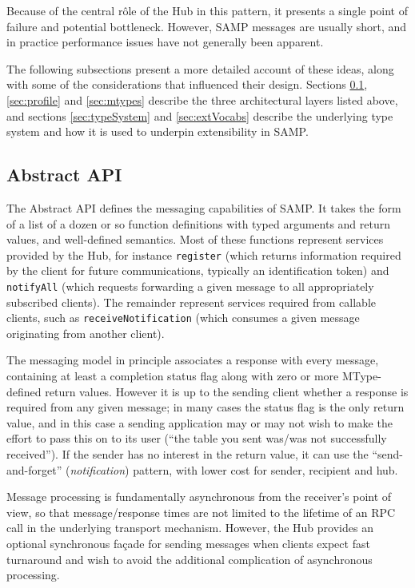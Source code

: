 \documentclass[5p]{elsarticle}
\begin{document}
Because of the central r\^{o}le of the Hub in this pattern,
it presents a single point of failure and potential bottleneck.
However, SAMP messages are usually short,
and in practice performance issues have not generally been apparent.

The following subsections present a more detailed account of
these ideas, along with some of the considerations that influenced
their design.
Sections \ref{sec:abstractApi}, \ref{sec:profile} and \ref{sec:mtypes}
describe the three architectural layers listed above,
and sections \ref{sec:typeSystem} and \ref{sec:extVocabs}
describe the underlying type system and how it is used to underpin
extensibility in SAMP.

\subsection{Abstract API} \label{sec:abstractApi}

The Abstract API defines the messaging capabilities of SAMP.
It takes the form of a list of a dozen or so function definitions
with typed arguments and return values, and well-defined semantics.
Most of these functions represent services provided by the Hub,
for instance
{\tt register} (which returns information required by the
client for future communications, typically an identification token)
and {\tt notifyAll} (which requests forwarding a given message to
all appropriately subscribed clients).
The remainder represent services required from callable clients, such as
{\tt receiveNotification} (which consumes a given message originating
from another client).

The messaging model in principle associates
a response with every message, containing at least a completion
status flag along with zero or more MType-defined return values.
However it is up to the sending client whether a response is
required from any given message; in many cases the status flag
is the only return value, and in this case a sending application
may or may not wish to make the effort to pass this on to its user
(``the table you sent was/was not successfully received'').
If the sender has no interest in the return value, it can use
the ``send-and-forget'' ({\em notification\/}) pattern,
with lower cost for sender, recipient and hub.

Message processing is fundamentally asynchronous from the
receiver's point of view, so that message/response times are
not limited to the lifetime of an RPC call in the underlying
transport mechanism.
However, the Hub provides an optional synchronous
fa\c{c}ade for sending messages when clients expect fast turnaround
and wish to avoid the additional complication of asynchronous processing.
\end{document}
